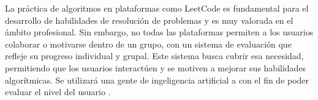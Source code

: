 La práctica de algoritmos en plataformas como LeetCode es fundamental para el desarrollo de habilidades de resolución de problemas y es muy valorada en el ámbito profesional. 
Sin embargo, no todas las plataformas permiten a los usuarios colaborar o motivarse dentro de un grupo, con un sistema de evaluación que refleje su progreso individual y grupal.
Este sistema busca cubrir esa necesidad, permitiendo que los usuarios interactúen y se motiven a mejorar sus habilidades algorítmicas. Se utilizará una gente de ingeligencia artificial
a con el fin de poder evaluar el nivel del usuario .

